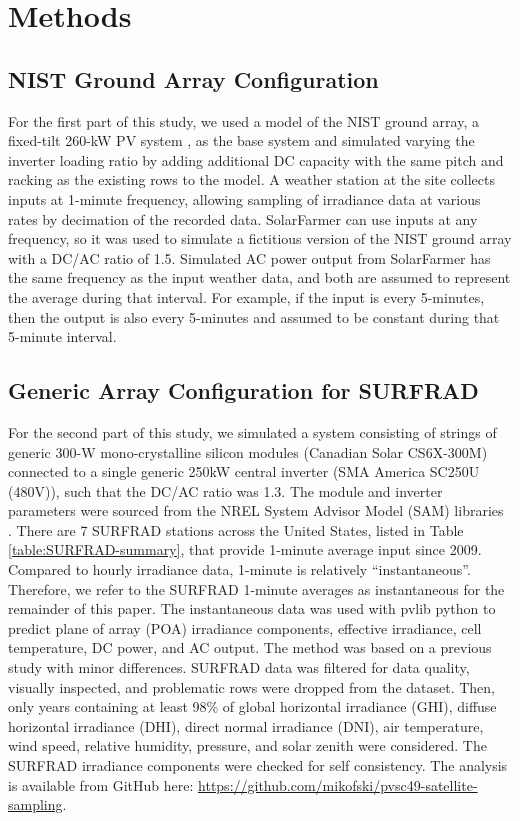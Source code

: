 \documentclass[conference]{IEEEtran}
\begin{document}
\section{Methods}

\subsection{NIST Ground Array Configuration}
For the first part of this study, we used a model of the NIST ground array, a fixed-tilt 260-kW PV system \cite{Boyd2017,Boyd2017a,Boyd2017b}, as the base system and simulated varying the inverter loading ratio by adding additional DC capacity with the same pitch and racking as the existing rows to the model. A weather station at the site collects inputs at 1-minute frequency, allowing sampling of irradiance data at various rates by decimation of the recorded data. SolarFarmer \cite{solarfarmer2018} can use inputs at any frequency, so it was used to simulate a fictitious version of the NIST ground array with a DC/AC ratio of 1.5. Simulated AC power output from SolarFarmer has the same frequency as the input weather data, and both are assumed to represent the average during that interval. For example, if the input is every 5-minutes, then the output is also every 5-minutes and assumed to be constant during that 5-minute interval.

\subsection{Generic Array Configuration for SURFRAD}
For the second part of this study, we simulated a system consisting of strings of generic 300-W mono-crystalline silicon modules (Canadian Solar CS6X-300M) connected to a single generic 250kW central inverter (SMA America SC250U (480V)), such that the DC/AC ratio was 1.3. The module and inverter parameters were sourced from the NREL System Advisor Model (SAM) libraries \cite{Freeman2018}. There are 7 SURFRAD \cite{Augustine2000} stations across the United States, listed in Table \ref{table:SURFRAD-summary}, that provide 1-minute average input since 2009. Compared to hourly irradiance data, 1-minute is relatively ``instantaneous''. Therefore, we refer to the SURFRAD 1-minute averages as instantaneous for the remainder of this paper. The instantaneous data was used with pvlib python \cite{pvlib2018} to predict plane of array (POA) irradiance components, effective irradiance, cell temperature, DC power, and AC output. The method was based on a previous study \cite{9519024} with minor differences. SURFRAD data was filtered for data quality, visually inspected, and problematic rows were dropped from the dataset. Then, only years containing at least 98\% of global horizontal irradiance (GHI), diffuse horizontal irradiance (DHI), direct normal irradiance (DNI), air temperature, wind speed, relative humidity, pressure, and solar zenith were considered. The SURFRAD irradiance components were checked for self consistency. The analysis is available from GitHub here: \url{https://github.com/mikofski/pvsc49-satellite-sampling}.
\end{document}

